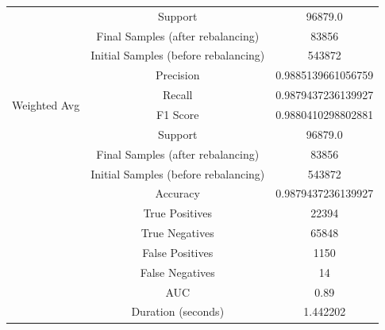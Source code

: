 \begin{longtable}{|c|c|c|}
 & Support & 96879.0 \\
 & Final Samples (after rebalancing) & 83856 \\
 & Initial Samples (before rebalancing) & 543872 \\
\hline
\multirow{4}{*}{Weighted Avg} & Precision & 0.9885139661056759 \\
 & Recall & 0.9879437236139927 \\
 & F1 Score & 0.9880410298802881 \\
 & Support & 96879.0 \\
 & Final Samples (after rebalancing) & 83856 \\
 & Initial Samples (before rebalancing) & 543872 \\
\hline
& Accuracy & 0.9879437236139927 \\ \hline
& True Positives & 22394 \\ \hline
& True Negatives & 65848 \\ \hline
& False Positives & 1150 \\ \hline
& False Negatives & 14 \\ \hline
& AUC & 0.89 \\ \hline
& Duration (seconds) & 1.442202 \\ \hline
\end{longtable}


